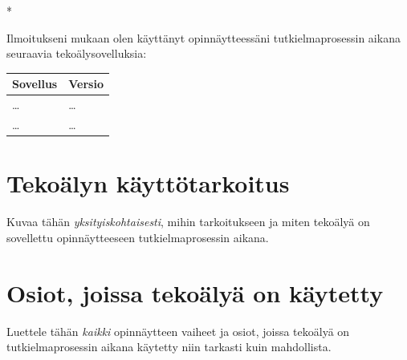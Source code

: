 \begin{aidisclaimer} * %

Ilmoitukseni mukaan olen käyttänyt opinnäytteessäni tutkielmaprosessin aikana
seuraavia tekoälysovelluksia:

\begin{center}
    \begin{tabularx}{\linewidth}{Xl}
        \hline\hline
        \textbf{Sovellus} & \textbf{Versio} \\
        \hline
        \dots & \dots \\
        \dots & \dots \\
        \hline\hline
    \end{tabularx}
\end{center}

\section*{Tekoälyn käyttötarkoitus}

Kuvaa tähän \emph{yksityiskohtaisesti}, mihin tarkoitukseen ja miten tekoälyä
on sovellettu opinnäytteeseen tutkielmaprosessin aikana.

\section*{Osiot, joissa tekoälyä on käytetty}

Luettele tähän \emph{kaikki} opinnäytteen vaiheet ja osiot, joissa tekoälyä on
tutkielmaprosessin aikana käytetty niin tarkasti kuin mahdollista.

\end{aidisclaimer}
